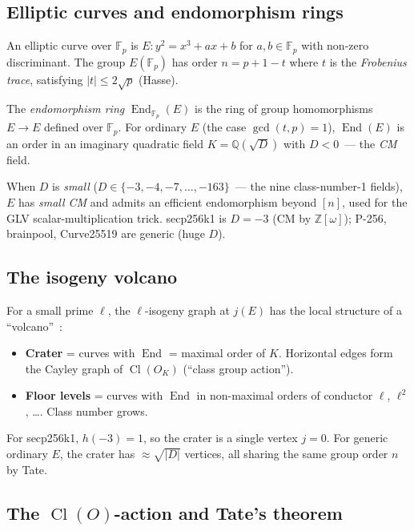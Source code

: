 \documentclass[11pt,a4paper]{article}
\theoremstyle{definition}
\newcommand{\FF}{\mathbb{F}}
\newcommand{\ZZ}{\mathbb{Z}}
\newcommand{\QQ}{\mathbb{Q}}
\newcommand{\End}{\operatorname{End}}
\newcommand{\Cl}{\operatorname{Cl}}
\newcommand{\gcd}{\operatorname{gcd}}
\begin{document}
\subsection{Elliptic curves and endomorphism rings}

An elliptic curve over $\FF_p$ is $E\colon y^2 = x^3 + ax + b$ for
$a, b \in \FF_p$ with non-zero discriminant. The group $E(\FF_p)$
has order $n = p + 1 - t$ where $t$ is the \emph{Frobenius trace},
satisfying $|t| \leq 2\sqrt{p}$ (Hasse).

The \emph{endomorphism ring} $\End_{\FF_p}(E)$ is the ring of
group homomorphisms $E \to E$ defined over $\FF_p$. For ordinary
$E$ (the case $\gcd(t, p) = 1$), $\End(E)$ is an order in an
imaginary quadratic field $K = \QQ(\sqrt{D})$ with $D < 0$~---
the \emph{CM} field.

When $D$ is \emph{small} ($D \in \{-3, -4, -7, \ldots, -163\}$~---
the nine class-number-1 fields), $E$ has \emph{small CM} and
admits an efficient endomorphism beyond $[n]$, used for the GLV
scalar-multiplication trick. secp256k1 is $D = -3$ (CM by
$\ZZ[\omega]$); P-256, brainpool, Curve25519 are generic (huge $D$).

\subsection{The isogeny volcano}

For a small prime $\ell$, the $\ell$-isogeny graph at $j(E)$ has
the local structure of a ``volcano''~\cite{kohel1996,fouquetmorain2002}:

\begin{itemize}
\item \textbf{Crater} = curves with $\End$ = maximal order of $K$.
      Horizontal edges form the Cayley graph of $\Cl(O_K)$ (``class
      group action'').
\item \textbf{Floor levels} = curves with $\End$ in non-maximal
      orders of conductor $\ell$, $\ell^2$, \ldots. Class number
      grows.
\end{itemize}

For secp256k1, $h(-3) = 1$, so the crater is a single vertex
$j = 0$. For generic ordinary $E$, the crater has $\approx
\sqrt{|D|}$ vertices, all sharing the same group order $n$ by
Tate.

\subsection{The $\Cl(O)$-action and Tate's theorem}
\end{document}
